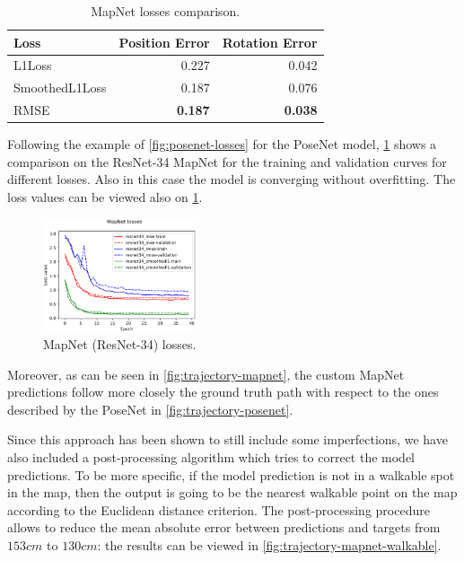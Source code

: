 \begin{table}[htbp]
    \caption{MapNet losses comparison.}
    \begin{center}
        \begin{tabular}{lrr}
            \toprule
            Loss            & {Position Error} & {Rotation Error} \\
            \midrule
            L1Loss          & 0.227            & 0.042            \\
            SmoothedL1Loss  & 0.187            & 0.076            \\
            RMSE            & \textbf{0.187}   & \textbf{0.038}   \\
            \bottomrule
        \end{tabular}
        \label{tab:mapnet-losses}
    \end{center}
\end{table}

Following the example of \cref{fig:posenet-losses} for the PoseNet model, \cref{fig:mapnet-losses} shows a comparison on the ResNet-34 MapNet for the training and validation curves for different losses. Also in this case the model is converging without overfitting. The loss values can be viewed also on \cref{tab:mapnet-losses}.
\begin{figure}[htbp]
    \begin{center}
        \includegraphics[width=0.4\textwidth]{./imgs/mapnet_losses.png}
    \end{center}
    \caption{MapNet (ResNet-34) losses.}
    \label{fig:mapnet-losses}
\end{figure}

Moreover, as can be seen in \cref{fig:trajectory-mapnet}, the custom MapNet predictions follow more closely the ground truth path with respect to the ones described by the PoseNet in \cref{fig:trajectory-posenet}.

Since this approach has been shown to still include some imperfections, we have also included a post-processing algorithm which tries to correct the model predictions. To be more specific, if the model prediction is not in a walkable spot in the map, then the output is going to be the nearest walkable point on the map according to the Euclidean distance criterion. The post-processing procedure allows to reduce the mean absolute error between predictions and targets from $153 cm$ to $130 cm$: the results can be viewed in \cref{fig:trajectory-mapnet-walkable}.

